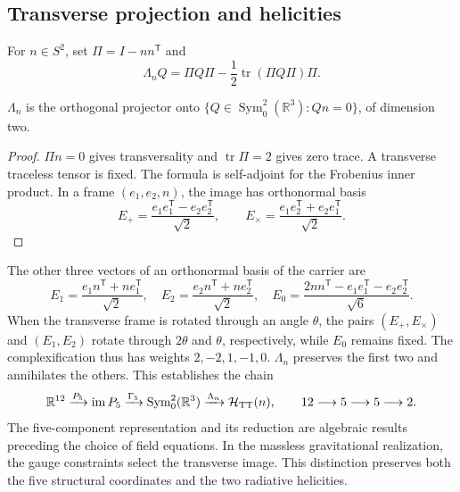 \subsection{Transverse projection and helicities}
For \(n\in S^2\), set \(\Pi=I-nn^{\mathsf T}\) and
\[
 \Lambda_nQ=\Pi Q\Pi-\frac12\operatorname{tr}(\Pi Q\Pi)\Pi.
\]
\begin{proposition}
\(\Lambda_n\) is the orthogonal projector onto
\(\{Q\in\operatorname{Sym}^2_0(\mathbb R^3):Qn=0\}\), of dimension two.
\end{proposition}
\begin{proof}
\(\Pi n=0\) gives transversality and \(\operatorname{tr}\Pi=2\) gives
zero trace. A transverse traceless tensor is fixed.
The formula is self-adjoint for the Frobenius inner product.
In a frame \((e_1,e_2,n)\), the image has orthonormal basis
\[
 E_+=\frac{e_1e_1^{\mathsf T}-e_2e_2^{\mathsf T}}{\sqrt2},\qquad
 E_\times=\frac{e_1e_2^{\mathsf T}+e_2e_1^{\mathsf T}}{\sqrt2}.
\]
\end{proof}
The other three vectors of an orthonormal basis of the carrier are
\[
 E_1=\frac{e_1n^{\mathsf T}+ne_1^{\mathsf T}}{\sqrt2},\quad
 E_2=\frac{e_2n^{\mathsf T}+ne_2^{\mathsf T}}{\sqrt2},\quad
 E_0=\frac{2nn^{\mathsf T}-e_1e_1^{\mathsf T}-e_2e_2^{\mathsf T}}{\sqrt6}.
\]
When the transverse frame is rotated through an angle \(\theta\), the pairs
\((E_+,E_\times)\) and \((E_1,E_2)\) rotate through \(2\theta\) and
\(\theta\), respectively, while \(E_0\) remains fixed. The
complexification thus has weights \(2,-2,1,-1,0\).
\(\Lambda_n\) preserves the first two and annihilates the others.
This establishes the chain
\[
 \mathbb R^{12}\xrightarrow{P_5}\operatorname{im}P_5
 \xrightarrow{\Gamma_5}\operatorname{Sym}^2_0(\mathbb R^3)
 \xrightarrow{\Lambda_n}\mathcal H_{\rm TT}(n),
 \qquad 12\longrightarrow5\longrightarrow5\longrightarrow2.
\]
The five-component representation and its reduction are algebraic
results preceding the choice of field equations.
In the massless gravitational realization, the gauge constraints
select the transverse image. This distinction preserves both the
five structural coordinates and the two radiative helicities.
